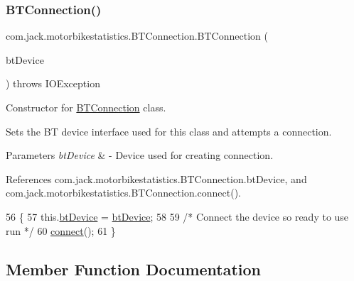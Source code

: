 \subsubsection{\texorpdfstring{B\+T\+Connection()}{BTConnection()}}
{\footnotesize\ttfamily com.\+jack.\+motorbikestatistics.\+B\+T\+Connection.\+B\+T\+Connection (\begin{DoxyParamCaption}\item[{Bluetooth\+Device}]{bt\+Device }\end{DoxyParamCaption}) throws I\+O\+Exception\hspace{0.3cm}{\ttfamily [inline]}}



Constructor for \hyperlink{classcom_1_1jack_1_1motorbikestatistics_1_1_b_t_connection}{B\+T\+Connection} class. 

Sets the BT device interface used for this class and attempts a connection.


\begin{DoxyParams}{Parameters}
{\em bt\+Device} & -\/ Device used for creating connection. \\
\hline
\end{DoxyParams}


References com.\+jack.\+motorbikestatistics.\+B\+T\+Connection.\+bt\+Device, and com.\+jack.\+motorbikestatistics.\+B\+T\+Connection.\+connect().


\begin{DoxyCode}
56                                \{
57         this.\hyperlink{classcom_1_1jack_1_1motorbikestatistics_1_1_b_t_connection_af49e78cef4253d96f009a9a1473e038d}{btDevice} = \hyperlink{classcom_1_1jack_1_1motorbikestatistics_1_1_b_t_connection_af49e78cef4253d96f009a9a1473e038d}{btDevice};
58 
59         \textcolor{comment}{/* Connect the device so ready to use run */}
60         \hyperlink{classcom_1_1jack_1_1motorbikestatistics_1_1_b_t_connection_a4c1b8ebff8a40a9cddd77a55b59b45af}{connect}();
61     \}
\end{DoxyCode}


\subsection{Member Function Documentation}
\mbox{\label{classcom_1_1jack_1_1motorbikestatistics_1_1_b_t_connection_aae8ee75e78f5beff98572bf3b13a60b8}} 
